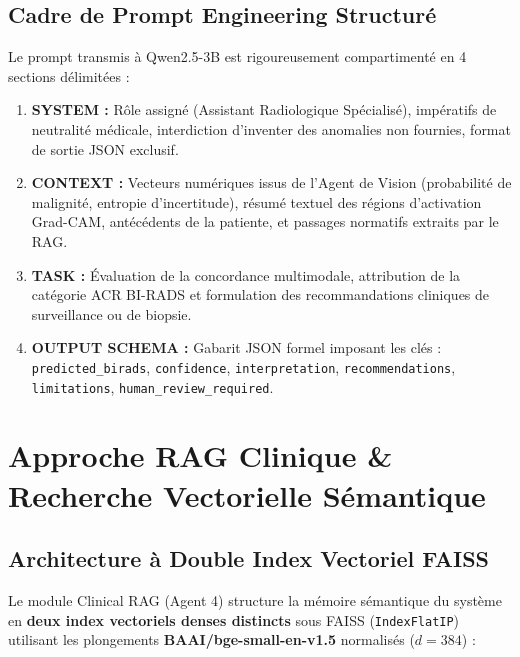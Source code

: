 \documentclass[11pt,a4paper]{article}
\begin{document}
\subsection{Cadre de Prompt Engineering Structuré}
Le prompt transmis \`a Qwen2.5-3B est rigoureusement compartiment\'e en 4 sections d\'elimit\'ees :
\begin{enumerate}
    \item \textbf{SYSTEM :} R\^ole assign\'e (Assistant Radiologique Sp\'ecialis\'e), imp\'eratifs de neutralit\'e m\'edicale, interdiction d'inventer des anomalies non fournies, format de sortie JSON exclusif.
    \item \textbf{CONTEXT :} Vecteurs num\'eriques issus de l'Agent de Vision (probabilit\'e de malignit\'e, entropie d'incertitude), r\'esum\'e textuel des r\'egions d'activation Grad-CAM, ant\'ec\'edents de la patiente, et passages normatifs extraits par le RAG.
    \item \textbf{TASK :} \'Evaluation de la concordance multimodale, attribution de la cat\'egorie ACR BI-RADS et formulation des recommandations cliniques de surveillance ou de biopsie.
    \item \textbf{OUTPUT SCHEMA :} Gabarit JSON formel imposant les cl\'es : \texttt{predicted\_birads}, \texttt{confidence}, \texttt{interpretation}, \texttt{recommendations}, \texttt{limitations}, \texttt{human\_review\_required}.
\end{enumerate}

\section{Approche RAG Clinique \& Recherche Vectorielle Sémantique}
\label{sec:rag_approach}

\subsection{Architecture à Double Index Vectoriel FAISS}
Le module Clinical RAG (Agent 4) structure la m\'emoire s\'emantique du syst\`eme en \textbf{deux index vectoriels denses distincts} sous FAISS (\texttt{IndexFlatIP}) utilisant les plongements \textbf{BAAI/bge-small-en-v1.5} normalis\'es ($d = 384$) :
\end{document}
